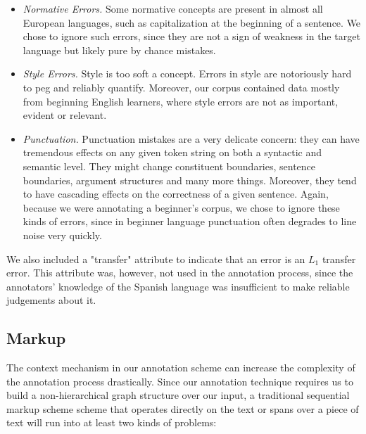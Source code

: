\documentclass[12pt]{article}
\begin{document}
\begin{itemize}
  \item \textit{Normative Errors.} Some normative concepts are present in almost
  all European languages, such as capitalization at the beginning of a sentence.
  We chose to ignore such errors, since they are not a sign of weakness in the
  target language but likely pure by chance mistakes.
  \item \textit{Style Errors.} Style is too soft a concept. Errors in style are
  notoriously hard to peg and reliably quantify. Moreover, our corpus
  contained data mostly from beginning English learners, where style errors are
  not as important, evident or relevant.
  \item \textit{Punctuation.} Punctuation mistakes are a very delicate concern:
  they can have tremendous effects on any given token string on both a syntactic
  and semantic level. They might change constituent boundaries, sentence
  boundaries, argument structures and many more things. Moreover, they tend to
  have cascading effects on the correctness of a given sentence. Again, because
  we were annotating a beginner's corpus, we chose to ignore these kinds of
  errors, since in beginner language punctuation often degrades to line noise
  very quickly.
\end{itemize}

We also included a "transfer" attribute to indicate that an error is an $L_1$
transfer error. This attribute was, however, not used in the annotation process,
since the annotators' knowledge of the Spanish language was insufficient to
make reliable judgements about it.

\subsection{Markup}

The context mechanism in our annotation scheme can increase the complexity of the annotation
process drastically. Since our annotation technique requires us to build a
non-hierarchical graph structure over our input\footnotemark, a traditional
sequential markup scheme scheme that operates directly on the text or spans
over a piece of text will run into at least two kinds of problems:

\end{document}

